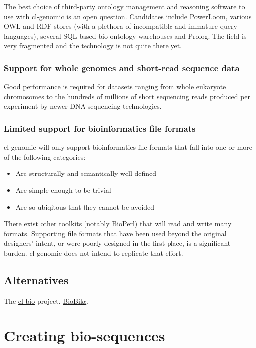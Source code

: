 \documentclass[a4paper, 12pt]{article}
\begin{document}
The best choice of third-party ontology management and reasoning
software to use with cl-genomic is an open question. Candidates
include PowerLoom, various OWL and RDF stores (with a plethora of
incompatible and immature query languages), several SQL-based
bio-ontology warehouses and Prolog. The field is very fragmented and
the technology is not quite there yet.


\subsubsection{Support for whole genomes and short-read sequence data}

Good performance is required for datasets ranging from whole eukaryote
chromosomes to the hundreds of millions of short sequencing reads
produced per experiment by newer DNA sequencing technologies.


\subsubsection{Limited support for bioinformatics file formats}
\label{sec:bioformats}

cl-genomic will only support bioinformatics file formats that fall
into one or more of the following categories:

\begin{itemize}
\item Are structurally and semantically well-defined
\item Are simple enough to be trivial
\item Are so ubiqitous that they cannot be avoided
\end{itemize}

There exist other toolkits (notably BioPerl) that will read and write
many formats. Supporting file formats that have been used beyond the
original designers' intent, or were poorly designed in the first
place, is a significant burden. cl-genomic does not intend to
replicate that effort.

\subsection{Alternatives}
\label{sec:alternate}

The \href{http://common-lisp.net/project/cl-bio}{cl-bio} project.
\href{http://www.biolisp.org}{BioBike}.


\section{Creating bio-sequences}
\label{sec:making-bioseq}
\end{document}
